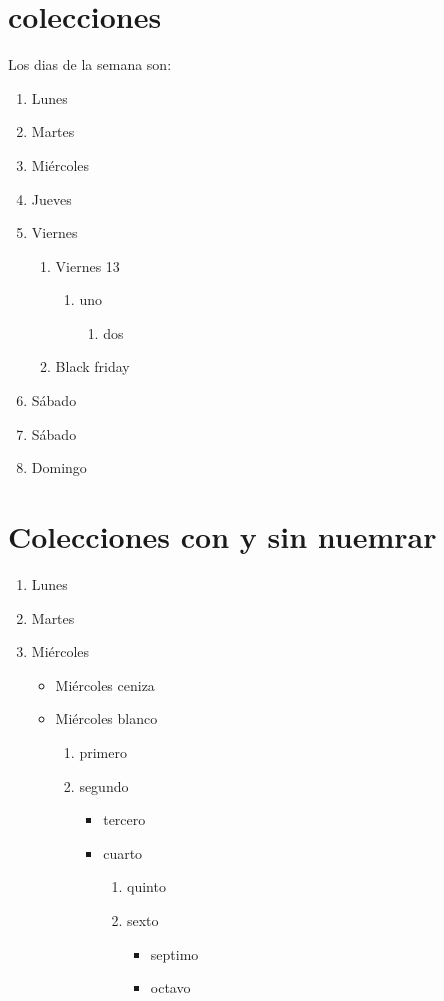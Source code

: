 \documentclass[10pt,a4paper]{article}
\begin{document}
\section{colecciones}
Los dias de la semana son:
	\begin{enumerate}
		\item Lunes
		\item Martes
		\item Miércoles
		\item Jueves
		\item Viernes
			\begin{enumerate}
				\item Viernes 13
					\begin{enumerate}
						\item uno
						\begin{enumerate}
							\item dos
						\end{enumerate}
							
					\end{enumerate}
				\item Black friday
			\end{enumerate}
		\item Sábado
		\item Sábado
		\item Domingo
	\end{enumerate}
	
	
\section{Colecciones con y sin nuemrar}

\begin{enumerate}
	\item Lunes
	\item Martes
	\item Miércoles
		\begin{itemize}
			\item Miércoles ceniza
			\item Miércoles blanco
				\begin{enumerate}
					\item primero
					\item segundo
						\begin{itemize}
							\item tercero
							\item cuarto
								\begin{enumerate}
									\item quinto
									\item sexto
										\begin{itemize}
											\item septimo
											\item octavo
										\end{itemize}
								\end{enumerate}
						\end{itemize}
				\end{enumerate}
		\end{itemize}
\end{enumerate}
\end{document}
